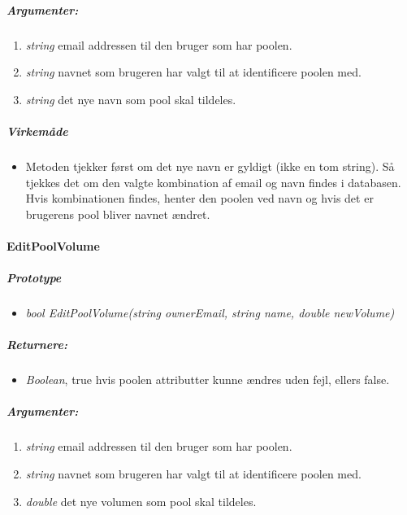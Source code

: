 \subparagraph{Argumenter:}
\begin{enumerate}
	\item \textit{string} email addressen til den bruger som har poolen.
	\item \textit{string} navnet som brugeren har valgt til at identificere poolen med.
	\item \textit{string} det nye navn som pool skal tildeles.
\end{enumerate}

\subparagraph{Virkemåde}
\begin{itemize}
	\item Metoden tjekker først om det nye navn er gyldigt (ikke en tom string). Så tjekkes det om den valgte kombination af email og navn findes i databasen. Hvis kombinationen findes, henter den poolen ved navn og hvis det er brugerens pool bliver navnet ændret.
\end{itemize}





\paragraph{EditPoolVolume}%







\subparagraph{Prototype}
\begin{itemize}
	\item \textit{bool EditPoolVolume(string ownerEmail, string name, double newVolume)}
\end{itemize}

\subparagraph{Returnere:}
\begin{itemize}
	\item \textit{Boolean}, true hvis poolen attributter kunne ændres uden fejl, ellers false.
\end{itemize}

\subparagraph{Argumenter:}
\begin{enumerate}
	\item \textit{string} email addressen til den bruger som har poolen.
	\item \textit{string} navnet som brugeren har valgt til at identificere poolen med.
	\item \textit{double} det nye volumen som pool skal tildeles.
\end{enumerate}


